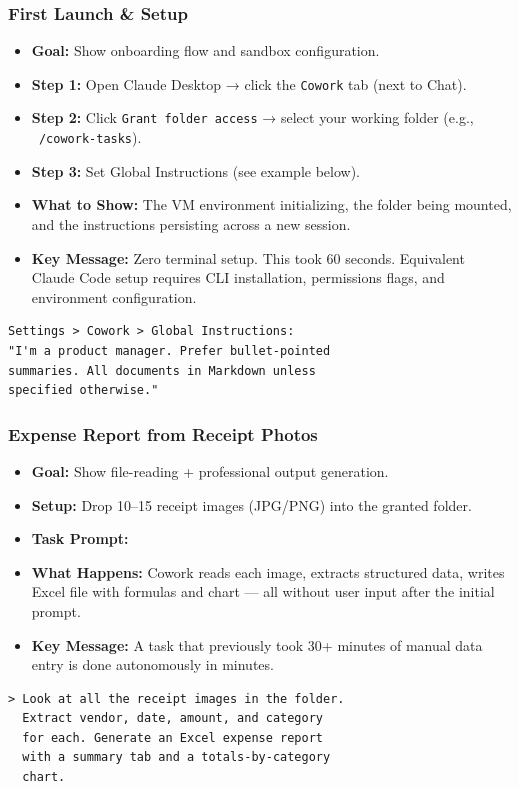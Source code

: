\begin{frame}[fragile]\frametitle{First Launch \& Setup}
  \begin{itemize}
    \item \textbf{Goal:} Show onboarding flow and sandbox configuration.
    \item \textbf{Step 1:} Open Claude Desktop → click the \texttt{Cowork} tab (next to Chat).
    \item \textbf{Step 2:} Click \texttt{Grant folder access} → select your working folder (e.g., \texttt{~/cowork-tasks}).
    \item \textbf{Step 3:} Set Global Instructions (see example below).
    \item \textbf{What to Show:} The VM environment initializing, the folder being mounted, and the instructions persisting across a new session.
    \item \textbf{Key Message:} Zero terminal setup. This took 60 seconds. Equivalent Claude Code setup requires CLI installation, permissions flags, and environment configuration.
  \end{itemize}
\begin{lstlisting}
Settings > Cowork > Global Instructions:
"I'm a product manager. Prefer bullet-pointed
summaries. All documents in Markdown unless
specified otherwise."
\end{lstlisting}
\end{frame}

\begin{frame}[fragile]\frametitle{Expense Report from Receipt Photos}
  \begin{itemize}
    \item \textbf{Goal:} Show file-reading + professional output generation.
    \item \textbf{Setup:} Drop 10–15 receipt images (JPG/PNG) into the granted folder.
    \item \textbf{Task Prompt:}
    \item \textbf{What Happens:} Cowork reads each image, extracts structured data, writes Excel file with formulas and chart — all without user input after the initial prompt.
    \item \textbf{Key Message:} A task that previously took 30+ minutes of manual data entry is done autonomously in minutes.
  \end{itemize}
\begin{lstlisting}
> Look at all the receipt images in the folder.
  Extract vendor, date, amount, and category
  for each. Generate an Excel expense report
  with a summary tab and a totals-by-category
  chart.
\end{lstlisting}
\end{frame}

